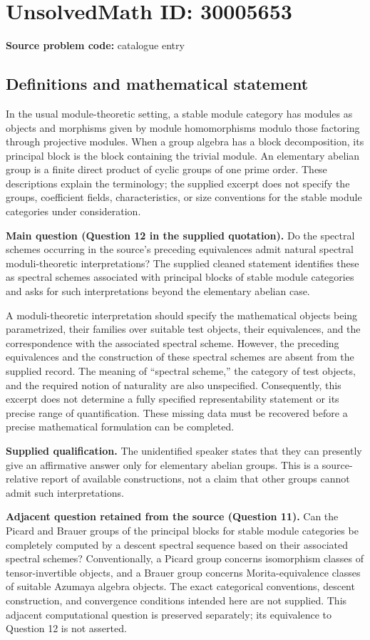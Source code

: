 \documentclass[11pt]{article}
\begin{document}
\section*{UnsolvedMath ID: 30005653}
\textbf{Source problem code:} catalogue entry
\subsection{Definitions and mathematical statement}
In the usual module-theoretic setting, a stable module category has modules as objects and morphisms given by module homomorphisms modulo those factoring through projective modules. When a group algebra has a block decomposition, its principal block is the block containing the trivial module. An elementary abelian group is a finite direct product of cyclic groups of one prime order. These descriptions explain the terminology; the supplied excerpt does not specify the groups, coefficient fields, characteristics, or size conventions for the stable module categories under consideration.

\textbf{Main question (Question 12 in the supplied quotation).} Do the spectral schemes occurring in the source's preceding equivalences admit natural spectral moduli-theoretic interpretations? The supplied cleaned statement identifies these as spectral schemes associated with principal blocks of stable module categories and asks for such interpretations beyond the elementary abelian case.

A moduli-theoretic interpretation should specify the mathematical objects being parametrized, their families over suitable test objects, their equivalences, and the correspondence with the associated spectral scheme. However, the preceding equivalences and the construction of these spectral schemes are absent from the supplied record. The meaning of ``spectral scheme,'' the category of test objects, and the required notion of naturality are also unspecified. Consequently, this excerpt does not determine a fully specified representability statement or its precise range of quantification. These missing data must be recovered before a precise mathematical formulation can be completed.

\textbf{Supplied qualification.} The unidentified speaker states that they can presently give an affirmative answer only for elementary abelian groups. This is a source-relative report of available constructions, not a claim that other groups cannot admit such interpretations.

\textbf{Adjacent question retained from the source (Question 11).} Can the Picard and Brauer groups of the principal blocks for stable module categories be completely computed by a descent spectral sequence based on their associated spectral schemes? Conventionally, a Picard group concerns isomorphism classes of tensor-invertible objects, and a Brauer group concerns Morita-equivalence classes of suitable Azumaya algebra objects. The exact categorical conventions, descent construction, and convergence conditions intended here are not supplied. This adjacent computational question is preserved separately; its equivalence to Question 12 is not asserted.
\end{document}
